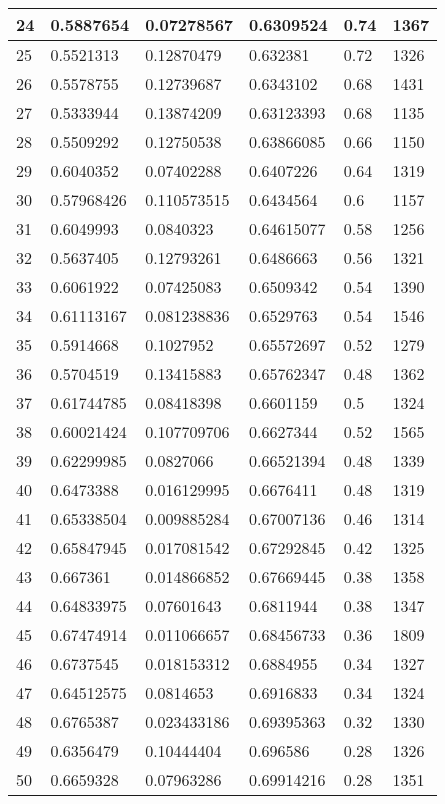 \begin{longtable}{|l|l|l|l|l|l|}
24 & 0.5887654 & 0.07278567 & 0.6309524 & 0.74 & 1367 \\ \hline 
25 & 0.5521313 & 0.12870479 & 0.632381 & 0.72 & 1326 \\ \hline 
26 & 0.5578755 & 0.12739687 & 0.6343102 & 0.68 & 1431 \\ \hline 
27 & 0.5333944 & 0.13874209 & 0.63123393 & 0.68 & 1135 \\ \hline 
28 & 0.5509292 & 0.12750538 & 0.63866085 & 0.66 & 1150 \\ \hline 
29 & 0.6040352 & 0.07402288 & 0.6407226 & 0.64 & 1319 \\ \hline 
30 & 0.57968426 & 0.110573515 & 0.6434564 & 0.6 & 1157 \\ \hline 
31 & 0.6049993 & 0.0840323 & 0.64615077 & 0.58 & 1256 \\ \hline 
32 & 0.5637405 & 0.12793261 & 0.6486663 & 0.56 & 1321 \\ \hline 
33 & 0.6061922 & 0.07425083 & 0.6509342 & 0.54 & 1390 \\ \hline 
34 & 0.61113167 & 0.081238836 & 0.6529763 & 0.54 & 1546 \\ \hline 
35 & 0.5914668 & 0.1027952 & 0.65572697 & 0.52 & 1279 \\ \hline 
36 & 0.5704519 & 0.13415883 & 0.65762347 & 0.48 & 1362 \\ \hline 
37 & 0.61744785 & 0.08418398 & 0.6601159 & 0.5 & 1324 \\ \hline 
38 & 0.60021424 & 0.107709706 & 0.6627344 & 0.52 & 1565 \\ \hline 
39 & 0.62299985 & 0.0827066 & 0.66521394 & 0.48 & 1339 \\ \hline 
40 & 0.6473388 & 0.016129995 & 0.6676411 & 0.48 & 1319 \\ \hline 
41 & 0.65338504 & 0.009885284 & 0.67007136 & 0.46 & 1314 \\ \hline 
42 & 0.65847945 & 0.017081542 & 0.67292845 & 0.42 & 1325 \\ \hline 
43 & 0.667361 & 0.014866852 & 0.67669445 & 0.38 & 1358 \\ \hline 
44 & 0.64833975 & 0.07601643 & 0.6811944 & 0.38 & 1347 \\ \hline 
45 & 0.67474914 & 0.011066657 & 0.68456733 & 0.36 & 1809 \\ \hline 
46 & 0.6737545 & 0.018153312 & 0.6884955 & 0.34 & 1327 \\ \hline 
47 & 0.64512575 & 0.0814653 & 0.6916833 & 0.34 & 1324 \\ \hline 
48 & 0.6765387 & 0.023433186 & 0.69395363 & 0.32 & 1330 \\ \hline 
49 & 0.6356479 & 0.10444404 & 0.696586 & 0.28 & 1326 \\ \hline 
50 & 0.6659328 & 0.07963286 & 0.69914216 & 0.28 & 1351 \\ \hline 
\end{longtable}